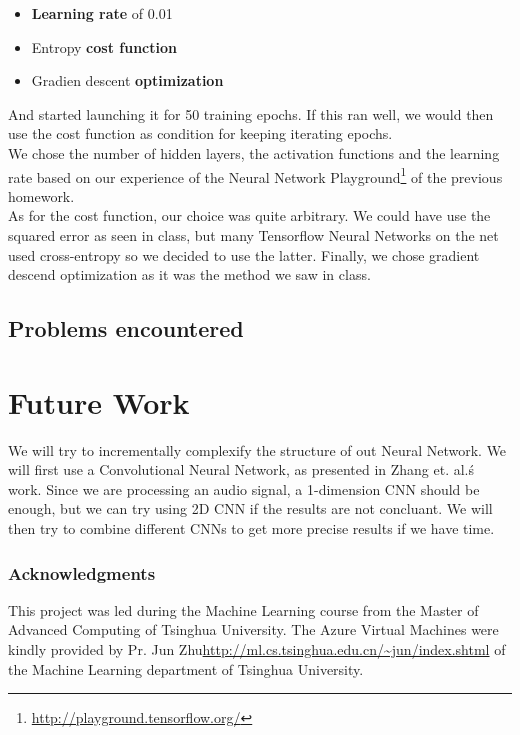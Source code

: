 \documentclass{article} %
\begin{document}
\begin{enumerate}
\begin{itemize}
						\item \textbf{Learning rate} of 0.01
						\item Entropy \textbf{cost function}
						\item Gradien descent \textbf{optimization}
					\end{itemize}
					And started launching it for 50 training epochs. If this ran well, we would then use the cost function as condition for keeping iterating epochs.\\
					We chose the number of hidden layers, the activation functions and the learning rate based on our experience of the Neural Network Playground\footnote{\url{http://playground.tensorflow.org/}} of the previous homework.\\
					As for the cost function, our choice was quite arbitrary. We could have use the squared error as seen in class, but many Tensorflow Neural Networks on the net used cross-entropy so we decided to use the latter. Finally, we chose gradient descend optimization as it was the method we saw in class.
			\end{enumerate}


		\subsection{Problems encountered}


\section{Future Work}
	We will try to incrementally complexify the structure of out Neural Network. We will first use a Convolutional Neural Network, as presented in Zhang et. al.\'s work\cite{cite6}. Since we are processing an audio signal, a 1-dimension CNN should be enough, but we can try using 2D CNN if the results are not concluant. We will then try to combine different CNNs to get more precise results if we have time.

\subsubsection*{Acknowledgments}

	This project was led during the Machine Learning course from the Master of Advanced Computing of Tsinghua University. The Azure Virtual Machines were kindly provided by Pr. Jun Zhu\url{http://ml.cs.tsinghua.edu.cn/~jun/index.shtml} of the Machine Learning department of Tsinghua University.

\nocite{*}


\end{document}
